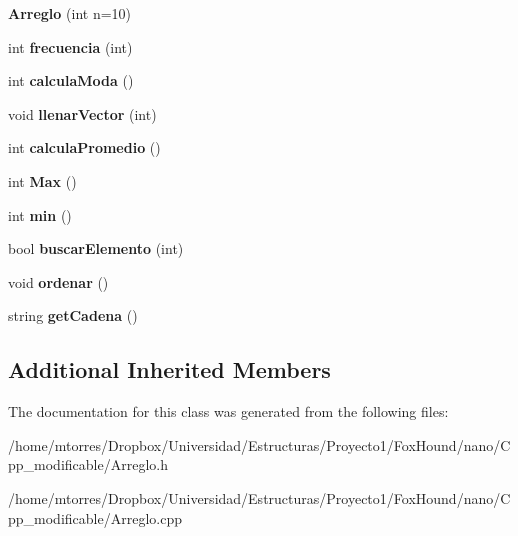 \begin{DoxyCompactItemize}
\item 
\hypertarget{class_arreglo_a7b1f2ffc92cf487669e7f79f17846fa3}{{\bfseries Arreglo} (int n=10)}\label{class_arreglo_a7b1f2ffc92cf487669e7f79f17846fa3}

\item 
\hypertarget{class_arreglo_a3e6f02f77742edb7d06e70ccc4e45e81}{int {\bfseries frecuencia} (int)}\label{class_arreglo_a3e6f02f77742edb7d06e70ccc4e45e81}

\item 
\hypertarget{class_arreglo_acc023752c5464f9b4d59a15e0b41350b}{int {\bfseries calcula\-Moda} ()}\label{class_arreglo_acc023752c5464f9b4d59a15e0b41350b}

\item 
\hypertarget{class_arreglo_ad36154e09ada2f3820a3e7f8c509ee02}{void {\bfseries llenar\-Vector} (int)}\label{class_arreglo_ad36154e09ada2f3820a3e7f8c509ee02}

\item 
\hypertarget{class_arreglo_a7660bc7418301470993d1ac173382c05}{int {\bfseries calcula\-Promedio} ()}\label{class_arreglo_a7660bc7418301470993d1ac173382c05}

\item 
\hypertarget{class_arreglo_a5d56f5cadec472e3168905fc8d5f1b2a}{int {\bfseries Max} ()}\label{class_arreglo_a5d56f5cadec472e3168905fc8d5f1b2a}

\item 
\hypertarget{class_arreglo_a39813d1a0e7449e750384e0006b6138f}{int {\bfseries min} ()}\label{class_arreglo_a39813d1a0e7449e750384e0006b6138f}

\item 
\hypertarget{class_arreglo_a127a808757ff23875f51d8ed9c0842ab}{bool {\bfseries buscar\-Elemento} (int)}\label{class_arreglo_a127a808757ff23875f51d8ed9c0842ab}

\item 
\hypertarget{class_arreglo_a8e3dbbeb70527ebd30da87c291230b1d}{void {\bfseries ordenar} ()}\label{class_arreglo_a8e3dbbeb70527ebd30da87c291230b1d}

\item 
\hypertarget{class_arreglo_ac9b3f3c78ae6ff874f1eaf10ad7f3339}{string {\bfseries get\-Cadena} ()}\label{class_arreglo_ac9b3f3c78ae6ff874f1eaf10ad7f3339}

\end{DoxyCompactItemize}
\subsection*{Additional Inherited Members}


The documentation for this class was generated from the following files\-:\begin{DoxyCompactItemize}
\item 
/home/mtorres/\-Dropbox/\-Universidad/\-Estructuras/\-Proyecto1/\-Fox\-Hound/nano/\-Cpp\-\_\-modificable/Arreglo.\-h\item 
/home/mtorres/\-Dropbox/\-Universidad/\-Estructuras/\-Proyecto1/\-Fox\-Hound/nano/\-Cpp\-\_\-modificable/Arreglo.\-cpp\end{DoxyCompactItemize}
